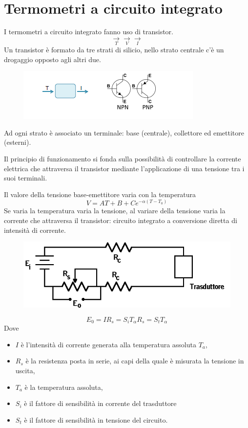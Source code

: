\documentclass[a4paper, 15pt]{article}
\begin{document}
\section{Termometri a circuito integrato}
\begin{adjustwidth}{2in}{}	
	I termometri a circuito integrato fanno uso di transistor.
	\[\underset{T}{\rightarrow}\boxed{}\underset{V}{\rightarrow}\boxed{}\underset{I}{\rightarrow}\]
	Un transistor è formato da tre strati di silicio, nello strato centrale c'è un drogaggio opposto agli altri due.
	\begin{figure}[H]
		\centering
		\includegraphics[width=0.5\linewidth]{immagini/screenshot034}
		\label{fig:screenshot034}
	\end{figure}	
	Ad ogni strato è associato un terminale: base (centrale), collettore ed
	emettitore (esterni). \newline 
	
	Il principio di funzionamento si fonda sulla possibilità di controllare la corrente elettrica che attraversa il transistor mediante l'applicazione di una tensione tra i suoi terminali. \newline 
	
	Il valore della tensione base-emettitore varia con la temperatura
	\[V = AT + B + Ce^{-\alpha(T-T_0)}\]
	Se varia la temperatura varia la tensione, al variare della tensione varia la corrente che attraversa il transistor: circuito integrato a conversione diretta di intensità di corrente.  
	\begin{figure}[H]
		\centering
		\includegraphics[width=0.3\linewidth]{immagini/screenshot035}
		\label{fig:screenshot035}
	\end{figure}
	\[E_0 = IR_s = S_iT_\alpha R_s = S_tT_\alpha\]
	Dove
	\begin{itemize}
		\item $I$ è l'intensità di corrente generata alla temperatura assoluta $T_a$,
		\item $R_s$ è la resistenza posta in serie, ai capi della quale è misurata la tensione in
		uscita,
		\item $T_a$ è la temperatura assoluta,
		\item $S_i$ è il fattore di sensibilità in corrente del trasduttore
		\item $S_t$ è il fattore di sensibilità in tensione del circuito.
	\end{itemize}
\end{adjustwidth}	
\end{document}
